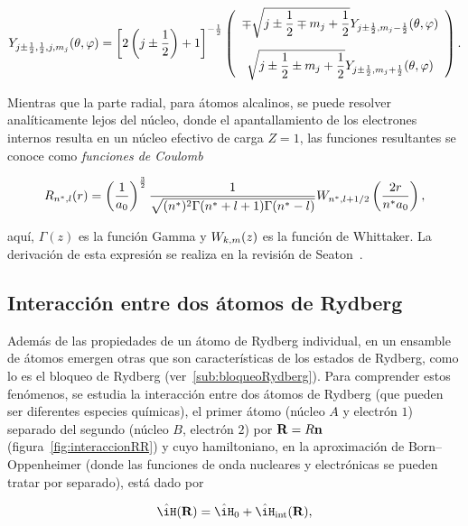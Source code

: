 \begin{equation}
\label{ec:armonicosEsfericosEspin}
Y_{j\pm\frac{1}{2},\frac{1}{2},j,m_{j}}(\theta,\varphi)=\left[2\left(j\pm\dfrac{1}{2}\right)+1\right]^{-\frac{1}{2}}\left(\begin{array}{c}
\mp\sqrt{j\pm\dfrac{1}{2}\mp m_{j}+\dfrac{1}{2}}Y_{j\pm\frac{1}{2},m_{j}-\frac{1}{2}}(\theta,\varphi)\\[5mm]
\sqrt{j\pm\dfrac{1}{2}\pm m_{j}+\dfrac{1}{2}}Y_{j\pm\frac{1}{2},m_{j}+\frac{1}{2}}(\theta,\varphi)
\end{array}\right).
\end{equation}

Mientras que la parte radial, para átomos alcalinos, se puede resolver analíticamente lejos del núcleo, donde el apantallamiento de los electrones internos resulta en un núcleo efectivo de carga $Z=1$, las funciones resultantes se conoce como \emph{funciones de Coulomb}

\begin{equation}
\label{ec:funcionCoulomb}
R_{n^{*},l}(r)=\left(\frac{1}{a_{0}}\right)^{\frac{3}{2}}\frac{1}{\sqrt{(n^{*})^{2}\Gamma(n^{*}+l+1)\Gamma(n^{*}-l)}}W_{n^{*},l+1/2}\left(\frac{2r}{n^{*}a_{0}}\right),
\end{equation}

aquí, $\Gamma(z)$ es la función Gamma y $W_{k,m}(z)$ es la función de Whittaker. La derivación de esta expresión se realiza en la revisión de Seaton~\cite{seaton}.

\subsection{\label{sub:interaccionRydberg}Interacción entre dos átomos de Rydberg}

Además de las propiedades de un átomo de Rydberg individual, en un ensamble de átomos emergen otras que son características de los estados de Rydberg, como lo es el bloqueo de Rydberg (ver~\ref{sub:bloqueoRydberg}). Para comprender estos fenómenos, se estudia la interacción entre dos átomos de Rydberg (que pueden ser diferentes especies químicas), el primer átomo (núcleo $A$ y electrón $1$) separado del segundo (núcleo $B$, electrón $2$) por $\text{\textbf{R}}=R\text{\textbf{n}}$ (figura~\ref{fig:interaccionRR}) y cuyo hamiltoniano, en la aproximación de Born–Oppenheimer (donde las funciones de onda nucleares y electrónicas se pueden tratar por separado), está dado por

\begin{equation}
\label{ec:hamiltonianoDosAtomos}
\hat{\iH}(\vektor{R})=\hat{\iH}_\sm{0}+\hat{\iH}_\sm{\text{int}}(\vektor{R}),
\end{equation}

